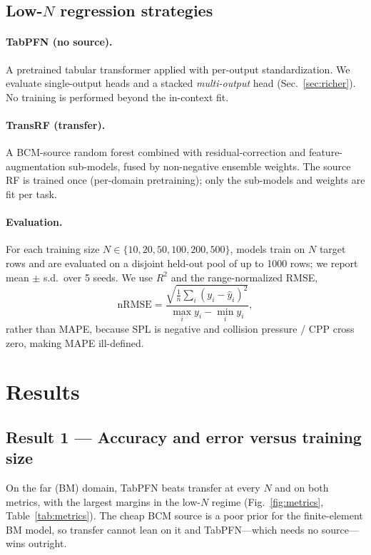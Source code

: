 \documentclass[11pt]{article}
\newcommand{\num}[1]{#1}
\begin{document}
\subsection{Low-$N$ regression strategies}
\label{sec:strategies}
\paragraph{TabPFN (no source).} A pretrained tabular transformer applied with
per-output standardization. We evaluate single-output heads and a stacked
\emph{multi-output} head (Sec.~\ref{sec:richer}). No training is performed
beyond the in-context fit.

\paragraph{TransRF (transfer).} A BCM-source random forest combined with
residual-correction and feature-augmentation sub-models, fused by non-negative
ensemble weights. The source RF is trained once (per-domain pretraining); only
the sub-models and weights are fit per task.

\paragraph{Evaluation.} For each training size $N\in\{10,20,50,100,200,500\}$,
models train on $N$ target rows and are evaluated on a disjoint held-out pool of
up to \num{1000} rows; we report mean $\pm$ s.d.\ over 5 seeds. We use $R^2$ and
the range-normalized RMSE,
\begin{equation}
  \mathrm{nRMSE} = \frac{\sqrt{\tfrac{1}{n}\sum_i (y_i-\hat y_i)^2}}
                        {\max_i y_i - \min_i y_i},
\end{equation}
rather than MAPE, because SPL is negative and collision pressure / CPP cross
zero, making MAPE ill-defined.

\section{Results}
\label{sec:results}

\subsection{Result 1 --- Accuracy and error versus training size}
\label{sec:metrics}
On the far (BM) domain, TabPFN beats transfer at every $N$ and on both metrics,
with the largest margins in the low-$N$ regime (Fig.~\ref{fig:metrics},
Table~\ref{tab:metrics}). The cheap BCM source is a poor prior for the
finite-element BM model, so transfer cannot lean on it and TabPFN---which needs
no source---wins outright.
\end{document}
